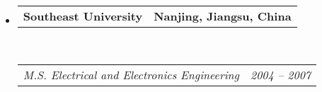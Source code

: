 \documentclass[10pt,letterpaper]{article}
\makeatletter
\newcommand{\headerrow}[2]
{\begin{tabular*}{\linewidth}{l@{\extracolsep{\fill}}r}
	#1 &
	#2 \\
\end{tabular*}}
\makeatother
\begin{document}
\begin{itemize}
	\item 
	\headerrow
		{\textbf{Southeast University}}
		{\textbf{Nanjing, Jiangsu, China}}
	\\
	\headerrow
		{\emph{M.S. Electrical and Electronics Engineering}}
		{\emph{2004 -- 2007}}


\end{itemize}
\end{document}

